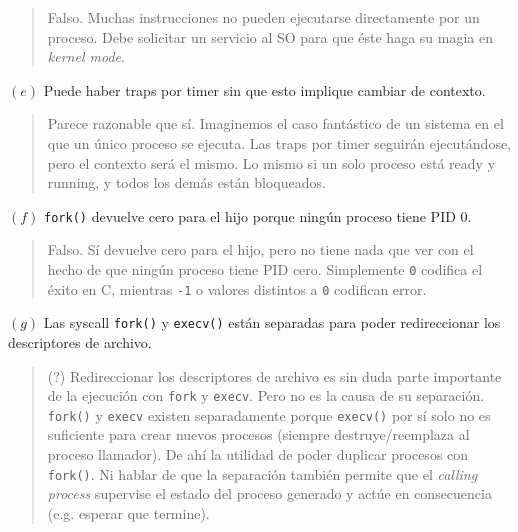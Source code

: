 \documentclass[12pt]{article}
\theoremstyle{definition}
\begin{document}
\small
\begin{quote}

Falso. Muchas instrucciones no pueden ejecutarse directamente por un proceso.
Debe solicitar un servicio al SO para que éste haga su magia en \textit{kernel
mode}.

\end{quote}
\normalsize


$(e)$ Puede haber traps por timer sin que esto implique cambiar de contexto.


\small
\begin{quote}

Parece razonable que sí. Imaginemos el caso fantástico de un sistema en el que
un único proceso se ejecuta. Las traps por timer seguirán ejecutándose, pero el
contexto será el mismo. Lo mismo si un solo proceso está ready y running, y
todos los demás están bloqueados.

\end{quote}
\normalsize

$(f)$ \texttt{fork()} devuelve cero para el hijo porque ningún proceso tiene PID
0.


\small
\begin{quote}

Falso. Sí devuelve cero para el hijo, pero no tiene nada que ver con el hecho de
que ningún proceso tiene PID cero. Simplemente \texttt{0} codifica el éxito en
C, mientras \texttt{-1} o valores distintos a \texttt{0} codifican error.

\end{quote}
\normalsize

$(g)$ Las syscall \texttt{fork()} y \texttt{execv()} están separadas para poder
redireccionar los descriptores de archivo.


\small
\begin{quote}

    (?) Redireccionar los descriptores de archivo es sin duda parte importante
    de la ejecución con \texttt{fork} y \texttt{execv}. Pero no es la causa de
    su separación. \texttt{fork()} y \texttt{execv} existen separadamente porque
    \texttt{execv()} por sí solo no es suficiente para crear nuevos procesos
    (siempre destruye/reemplaza al proceso llamador). De ahí la utilidad de
    poder duplicar procesos con \texttt{fork()}. Ni hablar de que la separación
    también permite que el \textit{calling process} supervise el estado del
    proceso generado y actúe en consecuencia (e.g. esperar que termine).
\end{quote}
\normalsize
\end{document}
